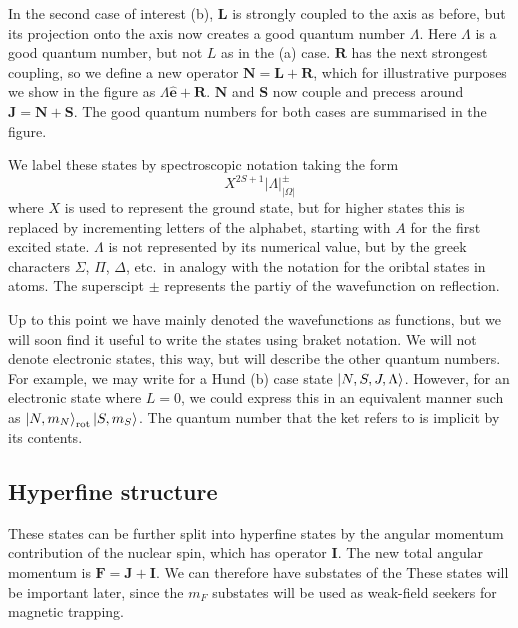 In the second case of interest (b), $\mathbf{L}$ is strongly coupled to the
axis as before, but its projection onto the axis now creates a good quantum
number $\Lambda$. Here $\Lambda$ is a good quantum number, but not $L$ as in
the (a) case. $\mathbf{R}$ has the next strongest coupling, so we define a new
operator $\mathbf{N} = \mathbf{L} + \mathbf{R}$, which for illustrative
purposes we show in the figure as $\Lambda \mathbf{\hat{e}} + \mathbf{R}$.
$\mathbf{N}$ and $\mathbf{S}$ now couple and precess around $\mathbf{J} =
\mathbf{N} + \mathbf{S}$. The good quantum numbers for both cases are
summarised in the figure.

We label these states by spectroscopic notation taking the form
%
\begin{equation*} 
  X^{2S+1}|\Lambda|^\pm_{|\Omega|}
\end{equation*}
%
where $X$ is used to represent the ground state, but for higher states this is
replaced by incrementing letters of the alphabet, starting with $A$ for the
first excited state. $\Lambda$ is not represented by its numerical value, but
by the greek characters $\Sigma$, $\Pi$, $\Delta$, etc.\ in analogy with the
notation for the oribtal states in atoms. The superscipt $\pm$ represents the
partiy of the wavefunction on reflection.

Up to this point we have mainly denoted the wavefunctions as functions, but we
will soon find it useful to write the states using braket notation. We will not
denote electronic states, this way, but will describe the other quantum
numbers. For example, we may write for a Hund (b) case state $\ket{N, S, J,
\Lambda}$. However, for an electronic state where $L=0$, we could express this
in an equivalent manner such as $\ket{N, m_N}_\text{rot}\ket{S, m_S}$. The
quantum number that the ket refers to is implicit by its contents.
%

\subsection{Hyperfine structure}

These states can be further split into hyperfine states by the angular momentum
contribution of the nuclear spin, which has operator $\mathbf{I}$.  The new
total angular momentum is  $\mathbf{F} = \mathbf{J} + \mathbf{I}$. We can
therefore have substates of the  These states
will be important later, since the $m_F$ substates will be used as weak-field
seekers for magnetic trapping.

